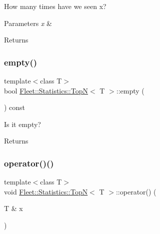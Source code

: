 How many times have we seen x? 
\begin{DoxyParams}{Parameters}
{\em x} & \\
\hline
\end{DoxyParams}
\begin{DoxyReturn}{Returns}

\end{DoxyReturn}
\mbox{\label{class_fleet_1_1_statistics_1_1_top_n_ac2b70eef6c75a0459acc88b2539dbc0b}} 
\subsubsection{\texorpdfstring{empty()}{empty()}}
{\footnotesize\ttfamily template$<$class T$>$ \\
bool \hyperlink{class_fleet_1_1_statistics_1_1_top_n}{Fleet\+::\+Statistics\+::\+TopN}$<$ T $>$\+::empty (\begin{DoxyParamCaption}{ }\end{DoxyParamCaption}) const\hspace{0.3cm}{\ttfamily [inline]}}

Is it empty? \begin{DoxyReturn}{Returns}

\end{DoxyReturn}
\mbox{\label{class_fleet_1_1_statistics_1_1_top_n_a3300639fe8eef303fb66e1630dc0790c}} 
\subsubsection{\texorpdfstring{operator()()}{operator()()}}
{\footnotesize\ttfamily template$<$class T$>$ \\
void \hyperlink{class_fleet_1_1_statistics_1_1_top_n}{Fleet\+::\+Statistics\+::\+TopN}$<$ T $>$\+::operator() (\begin{DoxyParamCaption}\item[{T \&}]{x }\end{DoxyParamCaption})\hspace{0.3cm}{\ttfamily [inline]}}

